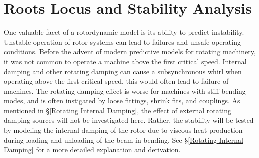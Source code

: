 \section{Roots Locus and Stability Analysis}
One valuable facet of a rotordynamic model is its ability to predict instability. Unstable operation of rotor systems can lead to failures and unsafe operating conditions. Before the advent of modern predictive models for rotating machinery, it was not common to operate a machine above the first critical speed. Internal damping and other rotating damping can cause a subsynchronous whirl when operating above the first critical speed, this would often lead to failure of machines. The rotating damping effect is worse for machines with stiff bending modes, and is often instigated by loose fittings, shrink fits, and couplings. As mentioned in \S\ref{Rotating Internal Damping}, the effect of external rotating damping sources will not be investigated here. Rather, the stability will be tested by modeling the internal damping of the rotor due to viscous heat production during loading and unloading of the beam in bending. See \S\ref{Rotating Internal Damping} for a more detailed explanation and derivation.\par 
